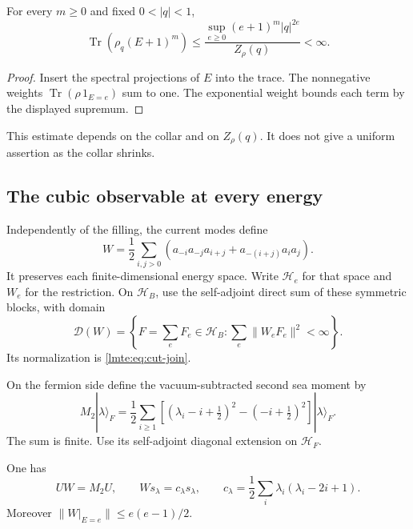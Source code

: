 \begin{lemma}\label{hfill:lem:collar-moments}
For every $m\geq0$ and fixed $0<|q|<1$,
\[
 \operatorname{Tr}(\rho_q(E+1)^m)
 \leq\frac{\sup_{e\geq0}(e+1)^m|q|^{2e}}{Z_\rho(q)}<\infty.
\]
\end{lemma}

\begin{proof}
Insert the spectral projections of $E$ into the trace.
The nonnegative weights $\operatorname{Tr}(\rho\,1_{E=e})$ sum to one.
The exponential weight bounds each term by the displayed supremum.
\end{proof}

This estimate depends on the collar and on $Z_\rho(q)$.
It does not give a uniform assertion as the collar shrinks.

\subsection{The cubic observable at every energy}

Independently of the filling, the current modes define
\begin{equation}\label{hfill:eq:W}
 W=\frac12\sum_{i,j>0}
       \left(a_{-i}a_{-j}a_{i+j}
                    +a_{-(i+j)}a_i a_j\right).
\end{equation}
It preserves each finite-dimensional energy space.
Write $\mathcal H_e$ for that space and $W_e$ for the restriction.
On $\mathcal H_B$, use the self-adjoint direct sum of these symmetric blocks,
with domain
\[
 \mathcal D(W)=\left\{F=\sum_eF_e\in\mathcal H_B:
                          \sum_e\|W_eF_e\|^2<\infty\right\}.
\]
Its normalization is \eqref{lmte:eq:cut-join}.

On the fermion side define the vacuum-subtracted second sea moment by
\[
 M_2|\lambda\rangle_F
 =\frac12\sum_{i\geq1}
   \left[(\lambda_i-i+\tfrac12)^2-(-i+\tfrac12)^2\right]
                                        |\lambda\rangle_F.
\]
The sum is finite. Use its self-adjoint diagonal extension on $\mathcal H_F$.

\begin{lemma}\label{hfill:lem:cut-join}
One has
\[
 UW=M_2U,\qquad
 Ws_\lambda=c_\lambda s_\lambda,
 \qquad
 c_\lambda=\frac12\sum_i\lambda_i(\lambda_i-2i+1).
\]
Moreover $\|W|_{E=e}\|\leq e(e-1)/2$.
\end{lemma}

